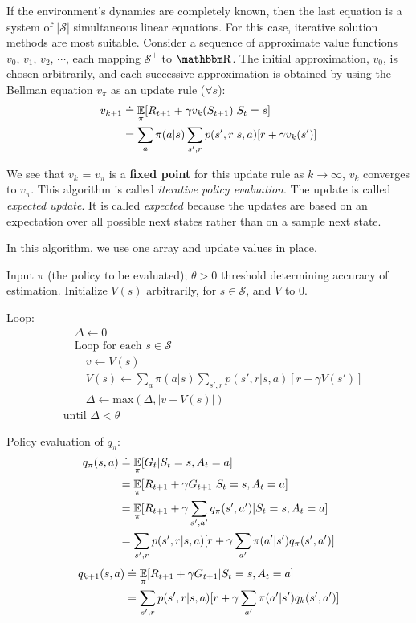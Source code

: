 \documentclass[sutton_barto_notes.tex]{subfiles}
\begin{document}
If the environment's dynamics are completely known, then the last equation is a system of $|\mathcal{S}|$ simultaneous linear equations.
For this case, iterative solution methods are most suitable. Consider a sequence of approximate value functions $v_0$, $v_1$, $v_2$, $\cdots$, each mapping $\mathcal{S^+}$ to $\R$.
The initial approximation, $v_0$, is chosen arbitrarily, and each successive approximation is obtained by using the Bellman equation $v_\pi$ as an update rule ($\forall s$):
\begin{align*}
v_{k+1} & \doteq \operatorname*{\mathbb{E}}_\pi [R_{t+1} + \gamma v_k (S_{t+1}) | S_t = s] \\
& = \sum_a \pi (a|s) \sum_{s',r} p(s',r|s,a)[r+\gamma v_k (s')]
\end{align*}

We see that $v_k$ = $v_\pi$ is a \textbf{fixed point} for this update rule as $k \rightarrow \infty$, $v_k$ converges to $v_\pi$. This algorithm is called \textit{iterative policy evaluation}.
The update is called \textit{expected update}. It is called \textit{expected} because the updates are based on an expectation over all possible next states rather than on a sample next state.

In this algorithm, we use one array and update values in place.
\begin{tcolorbox}[width=\textwidth,title={Iterative Policy Evaluation, for estimating $V \approx v_\pi$}]
Input $\pi$ (the policy to be evaluated); $\theta > 0$ threshold determining accuracy of estimation.
Initialize $V(s)$ arbitrarily, for $s \in \mathcal{S}$, and $V$ to 0.

Loop:
\begin{align*}
&\quad\Delta \leftarrow 0 \\
&\quad\text{Loop for each } s \in \mathcal{S} \\
&\quad\quad v \leftarrow V(s) \\
&\quad\quad V(s) \leftarrow \sum_a \pi (a|s) \sum_{s',r} p(s',r|s,a)[r + \gamma V(s')] \\
&\quad\quad \Delta \leftarrow \text{max}(\Delta, |v-V(s)|) \\
&\text{until } \Delta < \theta
\end{align*}
\end{tcolorbox}


Policy evaluation of $q_\pi$:
\begin{align*}
q_\pi(s,a) & \doteq \operatorname*{\mathbb{E}}_\pi [G_t | S_t = s, A_t = a] \\
& = \operatorname*{\mathbb{E}}_\pi [R_{t+1} + \gamma G_{t+1} | S_t = s, A_t = a] \\
& = \operatorname*{\mathbb{E}}_\pi [R_{t+1} + \gamma \sum_{s',a'} q_\pi (s',a') | S_t = s, A_t = a] \\
& = \sum_{s',r} p(s',r|s,a) [ r+ \gamma \sum_{a'} \pi(a'|s')q_\pi(s',a')]
\end{align*}
\begin{align*}
q_{k+1}(s,a) & \doteq \operatorname*{\mathbb{E}}_\pi [R_{t+1} + \gamma G_{t+1} | S_t = s, A_t = a] \\
& = \sum_{s',r} p(s',r|s,a)[r+\gamma \sum_{a'} \pi (a'|s')q_k(s',a')]
\end{align*}
\end{document}
